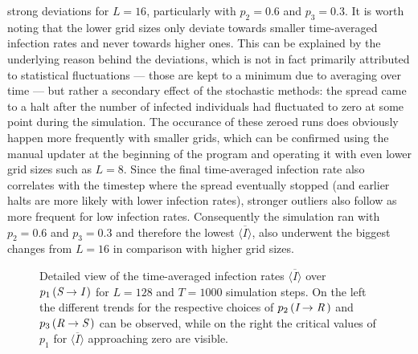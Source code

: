 strong deviations for $L=16$, particularly with $p_2=0.6$ and $p_3=0.3$. It is worth noting that the lower grid sizes only deviate towards smaller time-averaged infection rates and never towards higher ones. 
This can be explained by the underlying reason behind the deviations, which is not in fact primarily attributed to statistical fluctuations --- those are kept to a minimum due to averaging over time --- but
rather a secondary effect of the stochastic methods: the spread came to a halt after the number of infected individuals had fluctuated to zero at some point during the simulation. The occurance of these zeroed runs does
obviously happen more frequently with smaller grids, which can be confirmed using the manual updater at the beginning of the program and operating it with even lower grid sizes such as $L=8$.
Since the final time-averaged infection rate also correlates with the timestep where the spread eventually stopped (and earlier halts are more likely with lower infection rates), stronger outliers also follow as more frequent 
for low infection rates. Consequently the simulation ran with $p_2=0.6$ and $p_3=0.3$ and therefore the lowest $\overline{\langle I\rangle}$, also underwent the biggest changes from $L=16$ in comparison with higher grid sizes.

\begin{figure}[ht]
    \centering
    \resizebox{\textwidth}{!}{}
    \caption{Detailed view of the time-averaged infection rates $\overline{\langle I\rangle}$ over $p_1\left(\textit{S}\rightarrow\textit{I}\,\right)$ for $L=128$ and $T=1000$ simulation steps. On the left the different
    trends for the respective choices of $p_2\left(\textit{I}\rightarrow\textit{R}\,\right)$ and $p_3\left(\textit{R}\rightarrow\textit{S}\,\right)$ can be observed, 
    while on the right the critical values of $p_1$ for $\overline{\langle I\rangle}$ approaching zero are visible.}\label{fig:res_dis_avg_inf_over_p1_L128}
\end{figure}

